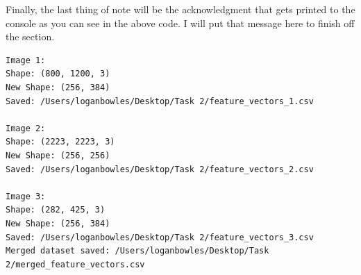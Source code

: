 \documentclass[conference]{IEEEtran} %
\begin{document}
Finally, the last thing of note will be the acknowledgment that gets printed to the console as you can see in the above code.  I will put that message here to finish off the section.

\begin{lstlisting}
Image 1: 
Shape: (800, 1200, 3)
New Shape: (256, 384)
Saved: /Users/loganbowles/Desktop/Task 2/feature_vectors_1.csv

Image 2: 
Shape: (2223, 2223, 3)
New Shape: (256, 256)
Saved: /Users/loganbowles/Desktop/Task 2/feature_vectors_2.csv

Image 3: 
Shape: (282, 425, 3)
New Shape: (256, 384)
Saved: /Users/loganbowles/Desktop/Task 2/feature_vectors_3.csv
Merged dataset saved: /Users/loganbowles/Desktop/Task 2/merged_feature_vectors.csv
\end{lstlisting}
\end{document}
